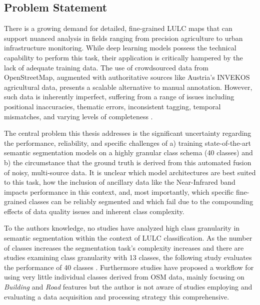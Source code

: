 \documentclass{report}
\begin{document}
\subsection{Problem Statement}
There is a growing demand for detailed, fine-grained LULC maps that can support nuanced analysis in fields ranging from precision agriculture to urban infrastructure monitoring. While deep learning models possess the technical capability to perform this task, their application is critically hampered by the lack of adequate training data. The use of crowdsourced data from OpenStreetMap, augmented with authoritative sources like Austria's INVEKOS agricultural data, presents a scalable alternative to manual annotation. However, such data is inherently imperfect, suffering from a range of issues including positional inaccuracies, thematic errors, inconsistent tagging, temporal mismatches, and varying levels of completeness \parencite[p.~2ff.]{UsmaniEtAlRemoteSensingDeepLearningUnderstandNoisyOpenStreetMap2023}.
\par
The central problem this thesis addresses is the significant uncertainty regarding the performance, reliability, and specific challenges of a) training state-of-the-art semantic segmentation models on a highly granular class schema (40 classes) and b) the circumstance that the ground truth is derived from this automated fusion of noisy, multi-source data. It is unclear which model architectures are best suited to this task, how the inclusion of ancillary data like the Near-Infrared band impacts performance in this context, and, most importantly, which specific fine-grained classes can be reliably segmented and which fail due to the compounding effects of data quality issues and inherent class complexity.
\par
To the authors knowledge, no studies have analyzed high class granularity in semantic segmentation within the context of LULC classification. As the number of classes increases the segmentation task's complexity increases and there are studies examining class granularity with 13 classes, the following study evaluates the performance of 40 classes \parencite[p.~1ff.]{SertelEtAlLandUseLandCoverMappingUsingDeepLearningBasedSegmentationApproachesVHRWorldview3Images2022}. Furthermore studies have proposed a workflow for using very little individual classes derived from OSM data, mainly focusing on \textit{Building} and \textit{Road} features but the author is not aware of studies employing and evaluating a data acquisition and processing strategy this comprehensive. 
\end{document}
